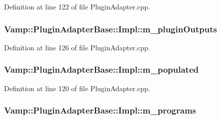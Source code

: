 Definition at line 122 of file Plugin\+Adapter.\+cpp.

\subsubsection[{\texorpdfstring{m\+\_\+plugin\+Outputs}{m_pluginOutputs}}]{ Vamp\+::\+Plugin\+Adapter\+Base\+::\+Impl\+::m\+\_\+plugin\+Outputs\hspace{0.3cm}{\ttfamily [protected]}}\hypertarget{class_vamp_1_1_plugin_adapter_base_1_1_impl_a193241eba6e9bcd3d4482c5f646d3822}{}\label{class_vamp_1_1_plugin_adapter_base_1_1_impl_a193241eba6e9bcd3d4482c5f646d3822}


Definition at line 126 of file Plugin\+Adapter.\+cpp.

\subsubsection[{\texorpdfstring{m\+\_\+populated}{m_populated}}]{ Vamp\+::\+Plugin\+Adapter\+Base\+::\+Impl\+::m\+\_\+populated\hspace{0.3cm}{\ttfamily [protected]}}\hypertarget{class_vamp_1_1_plugin_adapter_base_1_1_impl_a93384198b121720dfa627dafe77839a6}{}\label{class_vamp_1_1_plugin_adapter_base_1_1_impl_a93384198b121720dfa627dafe77839a6}


Definition at line 120 of file Plugin\+Adapter.\+cpp.

\subsubsection[{\texorpdfstring{m\+\_\+programs}{m_programs}}]{ Vamp\+::\+Plugin\+Adapter\+Base\+::\+Impl\+::m\+\_\+programs\hspace{0.3cm}{\ttfamily [protected]}}\hypertarget{class_vamp_1_1_plugin_adapter_base_1_1_impl_a79666690394693c9e293a4e74960b444}{}\label{class_vamp_1_1_plugin_adapter_base_1_1_impl_a79666690394693c9e293a4e74960b444}


